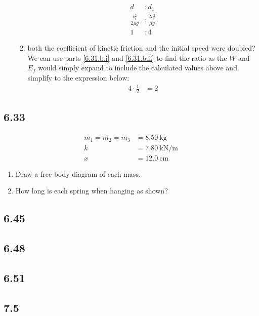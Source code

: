 \documentclass{article}
\begin{document}
\begin{enumerate}[label = \textbf{(\alph*)}]
\begin{enumerate}[label = \textbf{(\roman*)}]
\begin{align*}
					d & : d_1 \\
					\frac{v_i^2}{2\mu g} & : \frac{2v_i^2}{\mu g} \\
					1 & : 4
				\end{align*}
			\item both the coefficient of kinetic friction and the initial speed were doubled? \\
				We can use parts \ref{6.31.b.i} and \ref{6.31.b.ii} to find the ratio as the $ W $ and $ E_f $ would simply expand to include the calculated values above and simplify to the expression below:
				\begin{align*}
					4 \cdot \frac{1}{2} & = 2
				\end{align*}
		\end{enumerate}
\end{enumerate}

\subsection{6.33}

\begin{align*}
	m_1 = m_2 = m_3 & = \SI{8.50}{\kilogram} \\
	k & = \SI{7.80}{\kilo \newton \per \meter} \\
	x & = \SI{12.0}{\centi \meter}
\end{align*}

\begin{enumerate}[label = \textbf{(\alph*)}]
	\item Draw a free-body diagram of each mass.
	\item How long is each spring when hanging as shown?
\end{enumerate}

\subsection{6.45}

\subsection{6.48}

\subsection{6.51}

\subsection{7.5}
\end{document}
